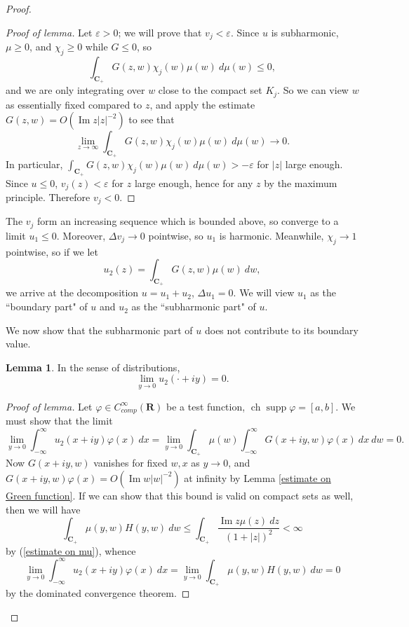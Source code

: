 \documentclass[12pt]{report}
\newcommand{\RR}{\mathbf{R}}
\newcommand{\CC}{\mathbf{C}}
\DeclareMathOperator{\ch}{ch}
\DeclareMathOperator{\supp}{supp}
\renewcommand{\Im}{\operatorname{Im}}
\theoremstyle{definition}
\newtheorem{lemma}[theorem]{Lemma}
\begin{document}
\begin{proof}
\begin{proof}[Proof of lemma]
    Let $\varepsilon > 0$; we will prove that $v_j < \varepsilon$. Since $u$ is subharmonic, $\mu \geq 0$, and $\chi_j \geq 0$ while $G \leq 0$, so
    $$\int_{\CC_+} G(z, w) \chi_j(w) \mu(w) ~d\mu(w) \leq 0,$$ and we are only integrating over $w$ close to the compact set $K_j$. So we can view $w$ as essentially fixed compared to $z$, and apply the estimate $G(z, w) = O(\Im z|z|^{-2})$ to see that
    $$\lim_{z \to \infty} \int_{\CC_+} G(z, w) \chi_j(w) \mu(w) ~d\mu(w) \to 0.$$
    In particular, $\int_{\CC_+} G(z, w) \chi_j(w) \mu(w) ~d\mu(w) > -\varepsilon$ for $|z|$ large enough. Since $u \leq 0$, $v_j(z) < \varepsilon$ for $z$ large enough, hence for any $z$ by the maximum principle. Therefore $v_j < 0$.
\end{proof}
    The $v_j$ form an increasing sequence which is bounded above, so converge to a limit $u_1 \leq 0$. Moreover, $\Delta v_j \to 0$ pointwise, so $u_1$ is harmonic. Meanwhile, $\chi_j \to 1$ pointwise, so if we let
$$u_2(z) = \int_{\CC_+} G(z, w) \mu(w) ~dw,$$
    we arrive at the decomposition $u = u_1 + u_2$, $\Delta u_1 = 0$. We will view $u_1$ as the ``boundary part" of $u$ and $u_2$ as the ``subharmonic part" of $u$.

    We now show that the subharmonic part of $u$ does not contribute to its boundary value.
\begin{lemma}
    In the sense of distributions,
$$\lim_{y \to 0} u_2(\cdot + iy) = 0.$$
\end{lemma}
\begin{proof}[Proof of lemma]
    Let $\varphi \in C^\infty_{comp}(\RR)$ be a test function, $\ch \supp \varphi = [a, b]$. We must show that the limit
$$\lim_{y \to 0} \int_{-\infty}^\infty u_2(x + iy) \varphi(x) ~dx = \lim_{y \to 0} \int_{\CC_+} \mu(w) \int_{-\infty}^\infty G(x + iy, w) \varphi(x) ~dx ~dw = 0.$$
    Now $G(x + iy, w)$ vanishes for fixed $w,x$ as $y \to 0$, and $G(x + iy, w) \varphi(x) = O(\Im w|w|^{-2})$ at infinity by Lemma \ref{estimate on Green function}. If we can show that this bound is valid on compact sets as well, then we will have
$$\int_{\CC_+} \mu(y, w) H(y, w) ~dw \leq \int_{\CC_+} \frac{\Im z \mu(z) ~dz}{(1 + |z|)^2} < \infty$$
    by (\ref{estimate on mu}), whence
$$\lim_{y \to 0} \int_{-\infty}^\infty u_2(x + iy) \varphi(x) ~dx = \lim_{y \to 0} \int_{\CC_+} \mu(y, w) H(y, w) ~dw = 0$$
    by the dominated convergence theorem.


\end{proof}
\end{proof}
\end{document}
